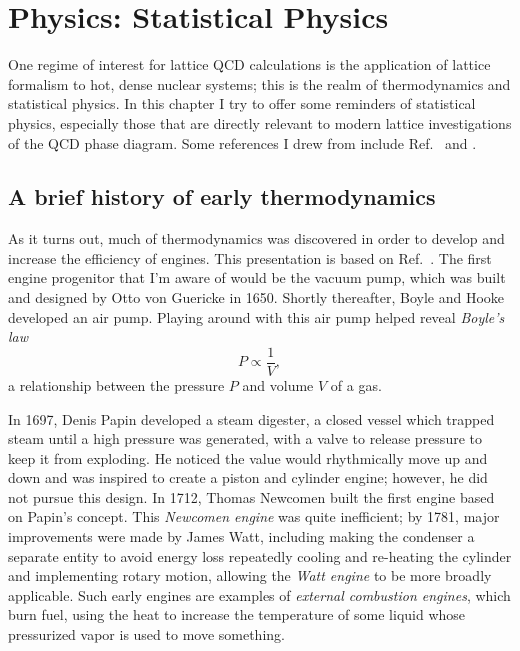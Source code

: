 \chapter{Physics: Statistical Physics}\label{ch:statphys}

One regime of interest for lattice QCD calculations is the application
of lattice formalism to hot, dense nuclear systems; this is the realm
of thermodynamics and statistical physics. In this chapter I try to
offer some reminders of statistical physics, especially those that
are directly relevant to modern lattice investigations of the QCD
phase diagram. Some references I drew from include
Ref.~\cite{tahir-kheli_general_2012} and \cite{kardar_statistical_2007}.

\section{A brief history of early thermodynamics}

As it turns out, much of thermodynamics was discovered in order to develop
and increase the efficiency of engines. This presentation is based
on Ref.~\cite{wiki:thermo}. The first engine progenitor that I'm
aware of would be the vacuum pump, which was built and designed by Otto von 
Guericke in 1650. Shortly thereafter, Boyle and Hooke developed an air pump.
Playing around with this air pump helped reveal {\it Boyle's law}
\begin{equation}
  P\propto\frac{1}{V},
\end{equation}
a relationship between the pressure $P$ and volume $V$ of a gas.

In 1697, Denis Papin developed a steam digester, a closed vessel which trapped steam 
until a high pressure was generated, with a valve to release pressure to keep it
from exploding.  He noticed the value would rhythmically move up and down and was 
inspired to create a piston and cylinder engine; however, he did not pursue this design. 
In 1712, Thomas Newcomen built the first engine based on Papin's concept.
This {\it Newcomen engine} was quite inefficient; by
1781, major improvements were made by James Watt, including making the condenser a separate
entity to avoid energy loss repeatedly cooling and re-heating the cylinder and
implementing rotary motion, allowing the {\it Watt engine} to 
be more broadly applicable.
Such early engines are examples of {\it external combustion engines}, which
burn
fuel, using the heat to increase the temperature of some liquid whose
pressurized vapor is used to move something.

